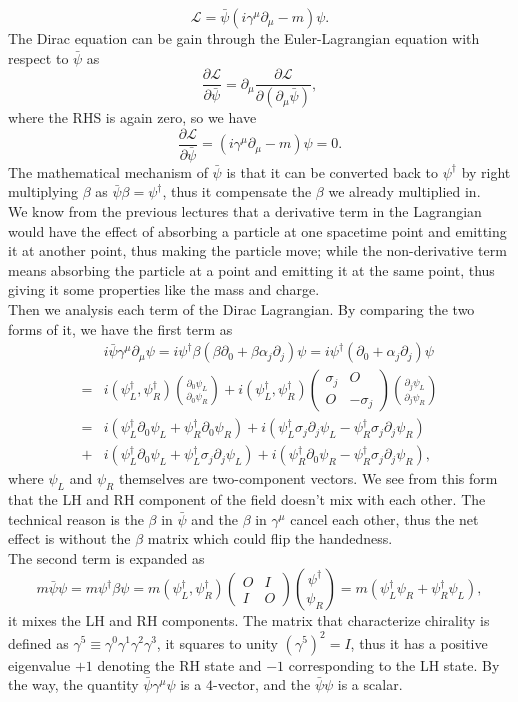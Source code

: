 \documentclass{article}
\newcommand{\be}{\begin{equation}}
\newcommand{\ee}{\end{equation}}
\newcommand{\ba}{\begin{array}}
\newcommand{\ea}{\end{array}}
\newcommand{\p}{\partial}
\renewcommand{\1}{\left}
\renewcommand{\2}{\right}
\newcommand{\ma}{\mathcal}
\newcommand{\m}{\mu}
\newcommand{\al}{\alpha}
\newcommand{\bet}{\beta}
\newcommand{\sig}{\sigma}
\begin{document}
\be
\ma L=\bar\psi (i\gamma^\m\p_\m-m)\psi.
\ee
The Dirac equation can be gain through the Euler-Lagrangian equation with respect to $\bar\psi$ as
\be
\frac{\p\ma L}{\p\bar\psi}=\p_\m\frac{\p\ma L}{\p(\p_\m\bar\psi)},
\ee
where the RHS is again zero, so we have
\be
\frac{\p\ma L}{\p\bar\psi}=(i\gamma^\m\p_\m-m)\psi=0.
\ee
The mathematical mechanism of $\bar\psi$ is that it can be converted back to $\psi^\dag$ by right multiplying $\bet$ as $\bar\psi\bet=\psi^\dag$, thus it compensate the $\bet$ we already multiplied in.\\
We know from the previous lectures that a derivative term in the Lagrangian would have the effect of absorbing a particle at one spacetime point and emitting it at another point, thus making the particle move; while the non-derivative term means absorbing the particle at a point and emitting it at the same point, thus giving it some properties like the mass and charge.\\

Then we analysis each term of the Dirac Lagrangian. By comparing the two forms of it, we have the first term as 
\be\begin{split}
&i\bar\psi\gamma^\m\p_\m\psi=i\psi^\dag\bet(\bet\p_0+\bet\al_j\p_j)\psi=i\psi^\dag(\p_0+\al_j\p_j)\psi\\
=&i(\psi_L^\dag,\psi_R^\dag)\binom{\p_0\psi_L}{\p_0\psi_R}+i(\psi_L^\dag,\psi_R^\dag)\1(\ba{cc}\sig_j&O\\O&-\sig_j\ea\2)\binom{\p_j\psi_L}{\p_j\psi_R}\\
=&i(\psi_L^\dag\p_0\psi_L+\psi_R^\dag\p_0\psi_R)+i(\psi_L^\dag\sig_j\p_j\psi_L-\psi_R^\dag\sig_j\p_j\psi_R)\\
+&i(\psi_L^\dag\p_0\psi_L+\psi_L^\dag\sig_j\p_j\psi_L)+i(\psi_R^\dag\p_0\psi_R-\psi_R^\dag\sig_j\p_j\psi_R),
\end{split}\ee
where $\psi_L$ and $\psi_R$ themselves are two-component vectors. We see from this form that the LH and RH component of the field doesn't mix with each other. The technical reason is the $\bet$ in $\bar\psi$ and the $\bet$ in $\gamma^\m$ cancel each other, thus the net effect is without the $\bet$ matrix which could flip the handedness.\\
The second term is expanded as
\be
m\bar\psi\psi=m\psi^\dag\bet\psi=m(\psi_L^\dag,\psi_R^\dag)\1(\ba{cc}O&I\\I&O\ea\2)\binom{\psi^\dag}{\psi_R}=m(\psi_L^\dag\psi_R+\psi_R^\dag\psi_L),
\ee
it mixes the LH and RH components. The matrix that characterize chirality is defined as $\gamma^5\equiv\gamma^0\gamma^1\gamma^2\gamma^3$, it squares to unity $(\gamma^5)^2=I$, thus it has a positive eigenvalue $+1$ denoting the RH state and $-1$ corresponding to the LH state. By the way, the quantity $\bar\psi\gamma^\m\psi$ is a $4$-vector, and the $\bar\psi\psi$ is a scalar.\\
\end{document}
